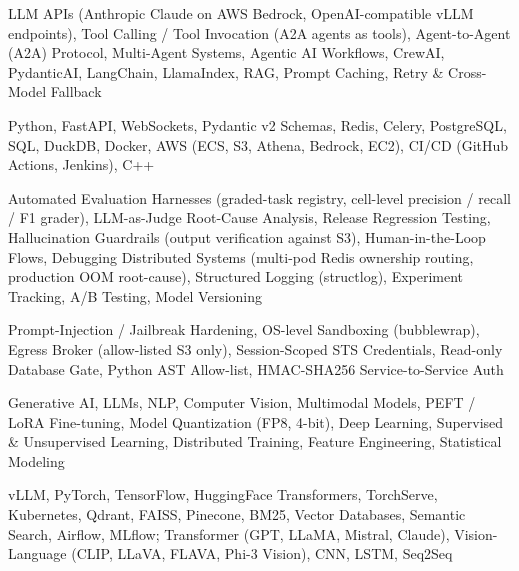 \documentclass[letter,10pt]{article}
\begin{document}
 LLM APIs (Anthropic Claude on AWS Bedrock, OpenAI-compatible vLLM endpoints), Tool Calling / Tool Invocation (A2A agents as tools), Agent-to-Agent (A2A) Protocol, Multi-Agent Systems, Agentic AI Workflows, CrewAI, PydanticAI, LangChain, LlamaIndex, RAG, Prompt Caching, Retry \& Cross-Model Fallback\par\vspace{2pt}

 Python, FastAPI, WebSockets, Pydantic v2 Schemas, Redis, Celery, PostgreSQL, SQL, DuckDB, Docker, AWS (ECS, S3, Athena, Bedrock, EC2), CI/CD (GitHub Actions, Jenkins), C++\par\vspace{2pt}

 Automated Evaluation Harnesses (graded-task registry, cell-level precision / recall / F1 grader), LLM-as-Judge Root-Cause Analysis, Release Regression Testing, Hallucination Guardrails (output verification against S3), Human-in-the-Loop Flows, Debugging Distributed Systems (multi-pod Redis ownership routing, production OOM root-cause), Structured Logging (structlog), Experiment Tracking, A/B Testing, Model Versioning\par\vspace{2pt}

 Prompt-Injection / Jailbreak Hardening, OS-level Sandboxing (bubblewrap), Egress Broker (allow-listed S3 only), Session-Scoped STS Credentials, Read-only Database Gate, Python AST Allow-list, HMAC-SHA256 Service-to-Service Auth\par\vspace{2pt}

 Generative AI, LLMs, NLP, Computer Vision, Multimodal Models, PEFT / LoRA Fine-tuning, Model Quantization (FP8, 4-bit), Deep Learning, Supervised \& Unsupervised Learning, Distributed Training, Feature Engineering, Statistical Modeling\par\vspace{2pt}

 vLLM, PyTorch, TensorFlow, HuggingFace Transformers, TorchServe, Kubernetes, Qdrant, FAISS, Pinecone, BM25, Vector Databases, Semantic Search, Airflow, MLflow; Transformer (GPT, LLaMA, Mistral, Claude), Vision-Language (CLIP, LLaVA, FLAVA, Phi-3 Vision), CNN, LSTM, Seq2Seq
\end{document}
